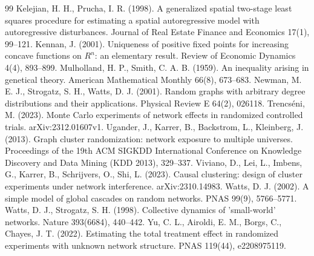 \documentclass[final,5p,times,twocolumn,number]{elsarticle}
\begin{document}
\begin{thebibliography}{99}
 Kelejian, H. H., Prucha, I. R. (1998). A generalized spatial two-stage least squares procedure for estimating a spatial autoregressive model with autoregressive disturbances. Journal of Real Estate Finance and Economics 17(1), 99–121.
 Kennan, J. (2001). Uniqueness of positive fixed points for increasing concave functions on $R^n$: an elementary result. Review of Economic Dynamics 4(4), 893–899.
 Mulholland, H. P., Smith, C. A. B. (1959). An inequality arising in genetical theory. American Mathematical Monthly 66(8), 673–683.
 Newman, M. E. J., Strogatz, S. H., Watts, D. J. (2001). Random graphs with arbitrary degree distributions and their applications. Physical Review E 64(2), 026118.
 Trencséni, M. (2023). Monte Carlo experiments of network effects in randomized controlled trials. arXiv:2312.01607v1.
 Ugander, J., Karrer, B., Backstrom, L., Kleinberg, J. (2013). Graph cluster randomization: network exposure to multiple universes. Proceedings of the 19th ACM SIGKDD International Conference on Knowledge Discovery and Data Mining (KDD 2013), 329–337.
 Viviano, D., Lei, L., Imbens, G., Karrer, B., Schrijvers, O., Shi, L. (2023). Causal clustering: design of cluster experiments under network interference. arXiv:2310.14983.
 Watts, D. J. (2002). A simple model of global cascades on random networks. PNAS 99(9), 5766–5771.
 Watts, D. J., Strogatz, S. H. (1998). Collective dynamics of 'small-world' networks. Nature 393(6684), 440–442.
 Yu, C. L., Airoldi, E. M., Borgs, C., Chayes, J. T. (2022). Estimating the total treatment effect in randomized experiments with unknown network structure. PNAS 119(44), e2208975119.
\end{thebibliography}
\endgroup
\end{document}
